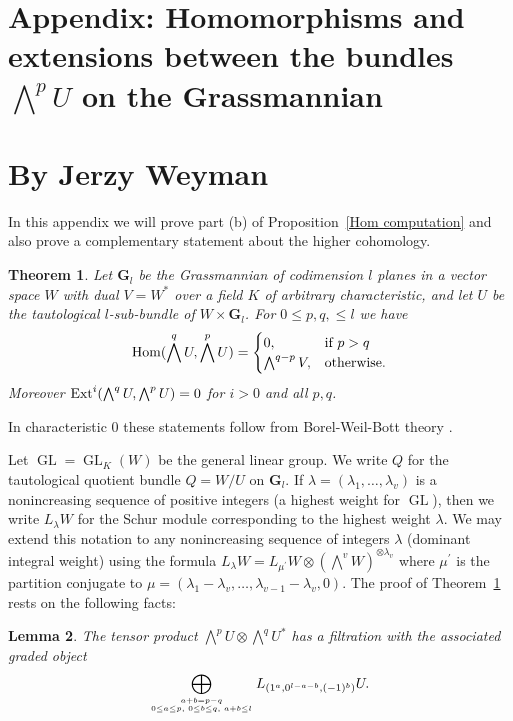 \documentclass{jams-l}
\newtheorem{theorem}{Theorem}[section]
\newtheorem{lemma}[theorem]{Lemma}
\theoremstyle{definition}
\theoremstyle{remark}
\newcommand{\GG}{{\mathbf G}}
\newcommand{\Hom}{{\mathop{\rm Hom}\nolimits}}
\newcommand{\GL}{{\operatorname{GL}}}
\newcommand{\Ext}{\text{\rm Ext}}
\begin{document}
\section*{Appendix: Homomorphisms and extensions between the bundles
$\bigwedge^pU$ on the Grassmannian}
\section*{By Jerzy Weyman}

In this appendix we will prove part (b) of Proposition~\ref{Hom computation}
and also prove a complementary statement about the higher cohomology.

\begin{theorem}\label{all char hom} 
Let $\GG_l$ be the Grassmannian of codimension
$l$ planes in a vector space $W$ with dual $V=W^*$ over a field $K$
of arbitrary characteristic, and let $U$ be the
tautological
$l$-sub-bundle of $W\times \GG_l$. For $0\leq p,q,\leq l$ we have
\[
\Hom(\bigwedge^qU, \bigwedge^pU)=
\begin{cases}0,&\text{if }
p > q\\\bigwedge^{q-p}V, &\text{otherwise.}\end{cases}
\]
Moreover $\Ext^i(\bigwedge^qU, \bigwedge^pU)=0$ for $i>0$ and all $p,q$.
\end{theorem}

In 
characteristic 0 these statements follow from Borel-Weil-Bott theory
\linebreak \cite{Jantzen 1987}.

Let $\GL=\GL_K(W)$ be the
general linear group. We write $Q$ for the tautological quotient
bundle $Q=W/U$ on $\GG_l$.
If $\lambda=(\lambda_1,\dots,\lambda_v)$ is a nonincreasing 
sequence of positive
integers (a highest weight for $\GL$), then we write $L_\lambda W$ for the Schur
module corresponding to the highest weight $\lambda$. 
We may extend this notation to any nonincreasing sequence of
integers $\lambda$ (dominant integral weight)
using the formula
$L_\lambda W=L_{\mu^\prime} W \otimes (\bigwedge^v W)^{\otimes \lambda_v}$
where 
$\mu^\prime$ is the partition conjugate to $\mu = (\lambda_1
-\lambda_v ,\ldots ,\lambda_{v-1}-\lambda_v ,0)$.
The proof of Theorem~\ref{all char hom} rests on the following
facts:

\begin{lemma}\label{A1} The tensor product  
$\bigwedge^p {U}\otimes\bigwedge^q {U}^* $ has a filtration with the
associated graded object
\[\bigoplus_{a+b=p-q\atop {0\le a\le p,\,\,0\le b\le q,\,\, a+b\le l}} 
L_{(1^a , 0^{l-a-b}, (-1)^b )}{U}.\]
\end{lemma}
\end{document}
